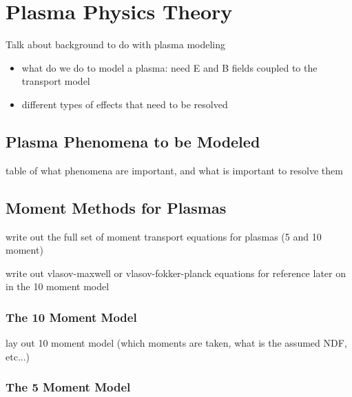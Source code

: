 \documentclass[titlepage,12pt,letterpaper]{article}
\begin{document}
\section{Plasma Physics Theory}\label{plasma}

Talk about background to do with plasma modeling
\begin{itemize}
  \item what do we do to model a plasma: need E and B fields coupled to the transport model
  \item different types of effects that need to be resolved
\end{itemize}


\subsection{Plasma Phenomena to be Modeled}\label{plasma:phenomena}

table of what phenomena are important, and what is important to resolve them


\subsection{Moment Methods for Plasmas}\label{plasma:moment_methods}

write out the full set of moment transport equations for plasmas (5 and 10 moment)

write out vlasov-maxwell or vlasov-fokker-planck equations for reference later on in the 10 moment model


\subsubsection{The 10 Moment Model}

lay out 10 moment model (which moments are taken, what is the assumed NDF, etc...)


\subsubsection{The 5 Moment Model}
\end{document}

